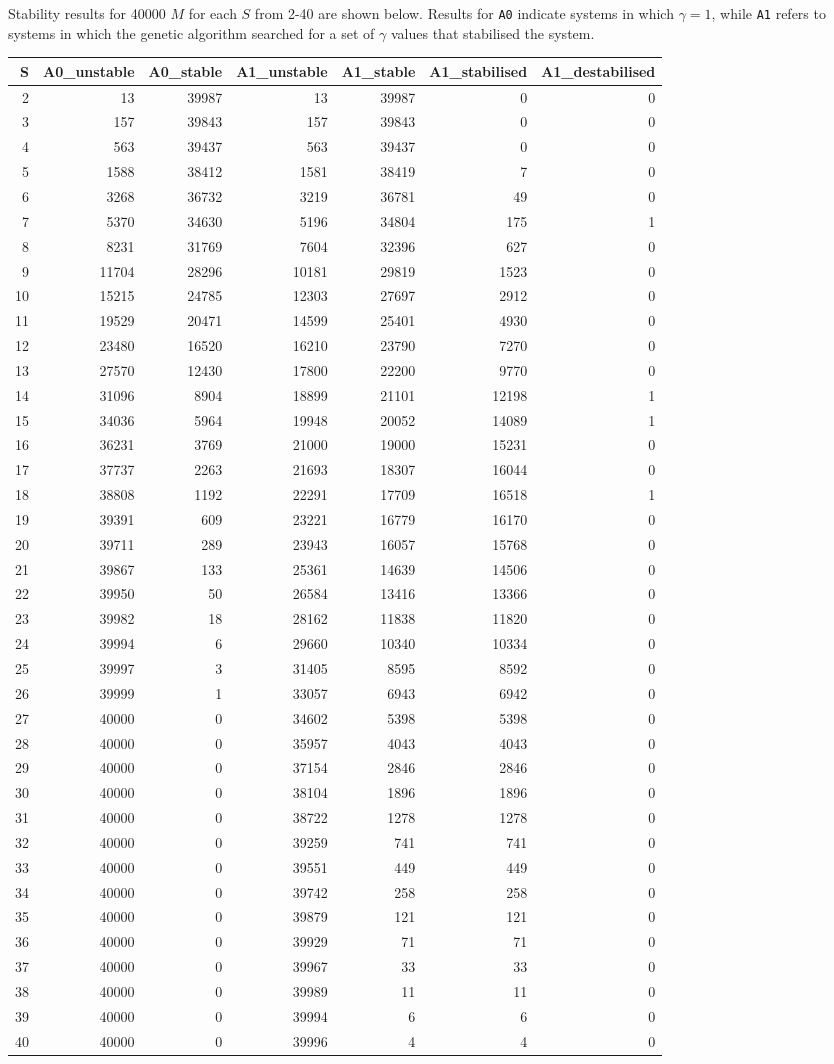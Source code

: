 \documentclass[]{article}
\begin{document}
Stability results for 40000 \(M\) for each \(S\) from 2-40 are shown
below. Results for \texttt{A0} indicate systems in which \(\gamma = 1\),
while \texttt{A1} refers to systems in which the genetic algorithm
searched for a set of \(\gamma\) values that stabilised the system.

\begin{longtable}[]{@{}rrrrrrr@{}}
\toprule
S & A0\_unstable & A0\_stable & A1\_unstable & A1\_stable &
A1\_stabilised & A1\_destabilised\tabularnewline
\midrule
\endhead
2 & 13 & 39987 & 13 & 39987 & 0 & 0\tabularnewline
3 & 157 & 39843 & 157 & 39843 & 0 & 0\tabularnewline
4 & 563 & 39437 & 563 & 39437 & 0 & 0\tabularnewline
5 & 1588 & 38412 & 1581 & 38419 & 7 & 0\tabularnewline
6 & 3268 & 36732 & 3219 & 36781 & 49 & 0\tabularnewline
7 & 5370 & 34630 & 5196 & 34804 & 175 & 1\tabularnewline
8 & 8231 & 31769 & 7604 & 32396 & 627 & 0\tabularnewline
9 & 11704 & 28296 & 10181 & 29819 & 1523 & 0\tabularnewline
10 & 15215 & 24785 & 12303 & 27697 & 2912 & 0\tabularnewline
11 & 19529 & 20471 & 14599 & 25401 & 4930 & 0\tabularnewline
12 & 23480 & 16520 & 16210 & 23790 & 7270 & 0\tabularnewline
13 & 27570 & 12430 & 17800 & 22200 & 9770 & 0\tabularnewline
14 & 31096 & 8904 & 18899 & 21101 & 12198 & 1\tabularnewline
15 & 34036 & 5964 & 19948 & 20052 & 14089 & 1\tabularnewline
16 & 36231 & 3769 & 21000 & 19000 & 15231 & 0\tabularnewline
17 & 37737 & 2263 & 21693 & 18307 & 16044 & 0\tabularnewline
18 & 38808 & 1192 & 22291 & 17709 & 16518 & 1\tabularnewline
19 & 39391 & 609 & 23221 & 16779 & 16170 & 0\tabularnewline
20 & 39711 & 289 & 23943 & 16057 & 15768 & 0\tabularnewline
21 & 39867 & 133 & 25361 & 14639 & 14506 & 0\tabularnewline
22 & 39950 & 50 & 26584 & 13416 & 13366 & 0\tabularnewline
23 & 39982 & 18 & 28162 & 11838 & 11820 & 0\tabularnewline
24 & 39994 & 6 & 29660 & 10340 & 10334 & 0\tabularnewline
25 & 39997 & 3 & 31405 & 8595 & 8592 & 0\tabularnewline
26 & 39999 & 1 & 33057 & 6943 & 6942 & 0\tabularnewline
27 & 40000 & 0 & 34602 & 5398 & 5398 & 0\tabularnewline
28 & 40000 & 0 & 35957 & 4043 & 4043 & 0\tabularnewline
29 & 40000 & 0 & 37154 & 2846 & 2846 & 0\tabularnewline
30 & 40000 & 0 & 38104 & 1896 & 1896 & 0\tabularnewline
31 & 40000 & 0 & 38722 & 1278 & 1278 & 0\tabularnewline
32 & 40000 & 0 & 39259 & 741 & 741 & 0\tabularnewline
33 & 40000 & 0 & 39551 & 449 & 449 & 0\tabularnewline
34 & 40000 & 0 & 39742 & 258 & 258 & 0\tabularnewline
35 & 40000 & 0 & 39879 & 121 & 121 & 0\tabularnewline
36 & 40000 & 0 & 39929 & 71 & 71 & 0\tabularnewline
37 & 40000 & 0 & 39967 & 33 & 33 & 0\tabularnewline
38 & 40000 & 0 & 39989 & 11 & 11 & 0\tabularnewline
39 & 40000 & 0 & 39994 & 6 & 6 & 0\tabularnewline
40 & 40000 & 0 & 39996 & 4 & 4 & 0\tabularnewline
\bottomrule
\end{longtable}
\end{document}
